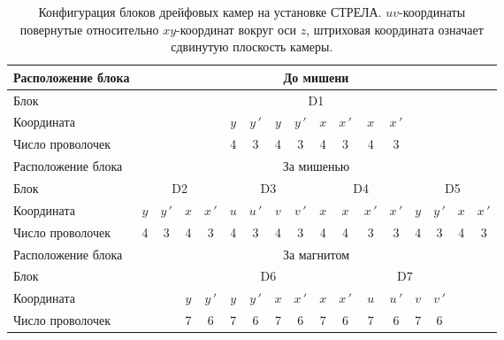 \begin{table}[h]
  \begin{center}
    \begin{tabular}{|l|c|c|c|c|c|c|c|c|c|c|c|c|c|c|c|c|}
      \hline
      Расположение блока & \multicolumn{16}{c|}{До мишени} \\
      \hline
      Блок & \multicolumn{4}{c|}{} &
      \multicolumn{8}{c|}{D1} & \multicolumn{4}{c|}{} \\
      \cline{6-13}
      Координата & \multicolumn{4}{c|}{} &
      $y$ & $y\,'$ & $y$ & $y\,'$ & $x$ & $x\,'$ & $x$ & $x\,'$ &
      \multicolumn{4}{c|}{} \\
      Число проволочек & \multicolumn{4}{c|}{} &
      4 & 3 & 4 & 3 & 4 & 3 & 4 & 3 & \multicolumn{4}{c|}{} \\
      \hline \hline

      Расположение блока & \multicolumn{16}{c|}{За мишенью} \\
      \hline
      Блок & \multicolumn{4}{c|}{D2} & \multicolumn{4}{c|}{D3} &
      \multicolumn{4}{c|}{D4} & \multicolumn{4}{c|}{D5} \\
      \cline{2-17}
      Координата & $y$ & $y\,'$ & $x$ & $x\,'$ & $u$ & $u\,'$ & $v$ & $v\,'$ &
      $x$ & $x$ & $x\,'$ & $x\,'$ & $y$ & $y\,'$ & $x$ & $x\,'$ \\
      Число проволочек &
      4 & 3 & 4 & 3 & 4 & 3 & 4 & 3 & 4 & 4 & 3 & 3 & 4 & 3 & 4 & 3 \\
      \hline \hline

      Расположение блока & \multicolumn{16}{c|}{За магнитом} \\
      \hline
      Блок & \multicolumn{2}{c|}{} & \multicolumn{8}{c|}{D6} &
      \multicolumn{4}{c|}{D7} & \multicolumn{2}{c|}{} \\
      \cline{4-15}
      Координата & \multicolumn{2}{c|}{} &
      $y$ & $y\,'$ & $y$ & $y\,'$ & $x$ & $x\,'$ & $x$ & $x\,'$ & $u$ & $u\,'$
      & $v$ & $v\,'$ &
      \multicolumn{2}{c|}{} \\
      Число проволочек & \multicolumn{2}{c|}{} &
      7 & 6 & 7 & 6 & 7 & 6 & 7 & 6 & 7 & 6 & 7 & 6 & \multicolumn{2}{c|}{} \\
      \hline
    \end{tabular}
    \caption{Конфигурация блоков дрейфовых камер на установке
      СТРЕЛА. $uv$-координаты повернутые относительно $xy$-координат вокруг оси
      $z$, штриховая координата означает сдвинутую плоскость камеры.}
    \label{tab:cham_config}
  \end{center}
\end{table}
